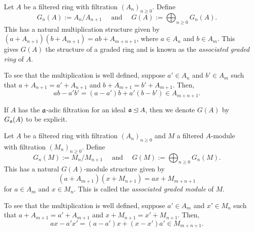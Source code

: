 \begin{definition}
    Let $A$ be a filtered ring with filtration $(A_n)_{n\ge0}$. Define 
    \begin{equation*}
        G_n(A) := A_n/A_{n + 1}\quad\text{ and }\quad G(A) := \bigoplus_{n\ge 0}G_n(A).
    \end{equation*}
    This has a natural multiplication structure given by $(a + A_{n + 1})(b + A_{m + 1}) = ab + A_{m + n + 1}$, where $a\in A_n$ and $b\in A_m$. This gives $G(A)$ the structure of a graded ring and is known as the \emph{associated graded ring} of $A$.
\end{definition}

To see that the multiplication is well defined, suppose $a'\in A_n$ and $b'\in A_m$ such that $a + A_{n + 1} = a' + A_{n + 1}$ and $b + A_{m + 1} = b' + A_{m + 1}$. Then, 
\begin{equation*}
    ab - a'b' = (a - a')b + a'(b - b')\in A_{m + n + 1}.
\end{equation*}

\begin{remark}
    If $A$ has the $\mathfrak a$-adic filtration for an ideal $\mathfrak a\unlhd A$, then we denote $G(A)$ by $G_\mathfrak a(A)$ to be explicit.
\end{remark}

\begin{definition}
    Let $A$ be a filtered ring with filtration $(A_n)_{n\ge 0}$ and $M$ a filtered $A$-module with filtration $(M_n)_{n\ge 0}$. Define 
    \begin{equation*}
        G_n(M) := M_n/M_{n + 1}\quad\text{ and }\quad G(M) := \bigoplus_{n\ge 0}G_n(M).
    \end{equation*}
    This has a natural $G(A)$-module structure given by 
    \begin{equation*}
        (a + A_{m + 1})(x + M_{n + 1}) = ax + M_{m + n + 1}
    \end{equation*}
    for $a\in A_m$ and $x\in M_n$. This is called the \emph{associated graded module} of $M$.
\end{definition}

To see that the multiplication is well defined, suppose $a'\in A_m$ and $x'\in M_n$ such that $a + A_{m + 1} = a' + A_{m + 1}$ and $x + M_{n + 1} = x' + M_{n + 1}$. Then, 
\begin{equation*}
    ax - a'x' = (a - a')x + (x - x')a'\in M_{m + n + 1}.
\end{equation*}

